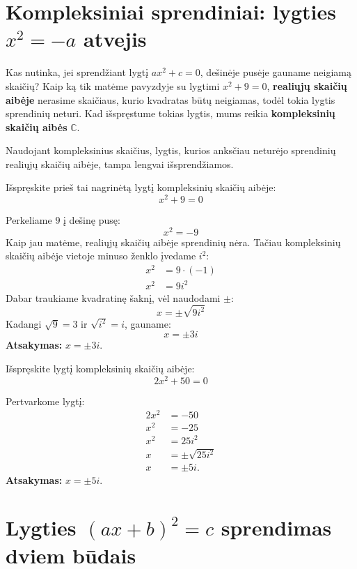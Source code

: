 \documentclass[11pt,a4paper]{scrartcl}
\begin{document}
\section{Kompleksiniai sprendiniai: lygties $x^2 = -a$ atvejis}

Kas nutinka, jei sprendžiant lygtį $ax^2+c=0$, dešinėje pusėje gauname neigiamą skaičių? Kaip ką tik matėme pavyzdyje su lygtimi $x^2 + 9 = 0$, \textbf{realiųjų skaičių aibėje} nerasime skaičiaus, kurio kvadratas būtų neigiamas, todėl tokia lygtis sprendinių neturi. Kad išspręstume tokias lygtis, mums reikia \textbf{kompleksinių skaičių aibės} $\mathbb{C}$.

Naudojant kompleksinius skaičius, lygtis, kurios anksčiau neturėjo sprendinių realiųjų skaičių aibėje, tampa lengvai išsprendžiamos.

\begin{example}
Išspręskite prieš tai nagrinėtą lygtį kompleksinių skaičių aibėje:
\[ x^2 + 9 = 0 \]
\end{example}
\begin{solution}
Perkeliame $9$ į dešinę pusę:
\[ x^2 = -9 \]
Kaip jau matėme, realiųjų skaičių aibėje sprendinių nėra. Tačiau kompleksinių skaičių aibėje vietoje minuso ženklo įvedame $i^2$:
\[
\begin{aligned}
x^2 &= 9 \cdot (-1) \\
x^2 &= 9i^2
\end{aligned}
\]
Dabar traukiame kvadratinę šaknį, vėl naudodami $\pm$:
\[ x = \pm\sqrt{9i^2} \]
Kadangi $\sqrt{9} = 3$ ir $\sqrt{i^2} = i$, gauname:
\[ x = \pm 3i \]
\textbf{Atsakymas:} $x = \pm 3i$.
\end{solution}

\begin{example}
Išspręskite lygtį kompleksinių skaičių aibėje:
\[ 2x^2 + 50 = 0 \]
\end{example}
\begin{solution}
Pertvarkome lygtį:
\[
\begin{aligned}
2x^2 &= -50 \\
x^2 &= -25 \\
x^2 &= 25i^2 \\
x &= \pm\sqrt{25i^2} \\
x &= \pm 5i.
\end{aligned}
\]
\textbf{Atsakymas:} $x = \pm 5i$.
\end{solution}

\section{Lygties $(ax+b)^2=c$ sprendimas dviem būdais}
\end{document}
